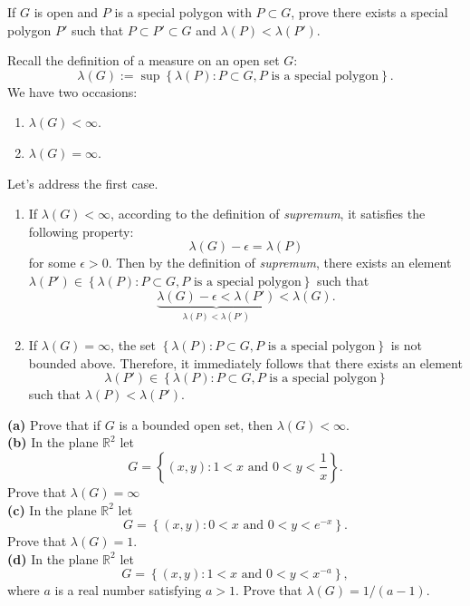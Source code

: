 \documentclass[answers]{exam}
\begin{document}
\newpage
{}
\begin{questions}
   \question
   If $G$ is open and $P$ is a special polygon with $P \subset G$, prove there exists a special polygon $P'$ such that $P \subset P' \subset G$ and $\lambda\left(P\right) <\lambda\left(P'\right)$.
   \begin{solution}
      Recall the definition of a measure on an open set $G$:
      $$
         \lambda\left(G\right) := \sup \left\{\lambda\left(P\right): P \subset G, P \text{ is a special polygon} \right\}.
      $$
      We have two occasions: 
      \begin{enumerate}
      \item $\lambda\left(G\right) < \infty$.
      \item $\lambda\left(G\right) = \infty$. \end{enumerate}
      Let's address the first case.
      \begin{enumerate}
         \item If $\lambda\left(G\right) < \infty$, according to the definition of \emph{supremum}, it satisfies the following property:
         $$
            \lambda\left(G\right) - \epsilon = \lambda\left(P\right)
         $$
         for some $\epsilon > 0$. Then by the definition of \emph{supremum}, there exists an element $\lambda\left(P'\right) \in \left\{\lambda\left(P\right): P \subset G, P \text{ is a special polygon} \right\}$ such that
         $$
            \underbrace{\lambda\left(G\right) - \epsilon < \lambda\left(P'\right)}_{\lambda\left(P\right) < \lambda\left(P'\right)} < \lambda\left(G\right).
         $$
         \item If $\lambda\left(G\right) = \infty$, the set $\left\{\lambda\left(P\right): P \subset G, P\text{ is a special polygon} \right\}$ is not bounded above. Therefore, it immediately follows that there exists an element $$\lambda\left(P'\right) \in \left\{\lambda\left(P\right): P \subset G, P\text{ is a special polygon} \right\}$$ such that $\lambda\left(P\right) < \lambda\left(P'\right)$.
      \end{enumerate}
   \end{solution}
   \question
   \textbf{(a)} Prove that if $G$ is a bounded open set, then $\lambda\left(G\right)<\infty$.\\
   \textbf{(b)} In the plane $\mathbb{R}^{2}$ let
   $$
      G = \left\{\left(x,y\right): 1<x \text{ and } 0<y<\frac{1}{x} \right\}.
   $$
   Prove that $\lambda\left(G\right) = \infty$\\
   \textbf{(c)} In the plane $\mathbb{R}^{2}$ let
   $$
      G = \left\{\left(x,y\right): 0<x \text{ and } 0<y<e^{-x} \right\}.
   $$
   Prove that $\lambda\left(G\right)=1$. \\
   \textbf{(d)} In the plane $\mathbb{R}^{2}$ let
   $$
      G = \left\{\left(x,y\right): 1<x \text{ and } 0<y<x^{-a} \right\},
   $$
   where $a$ is a real number satisfying $a>1$. Prove that $\lambda\left(G\right) = 1/\left(a-1\right)$.
   \begin{solution}


\end{solution}
\end{questions}
\end{document}

